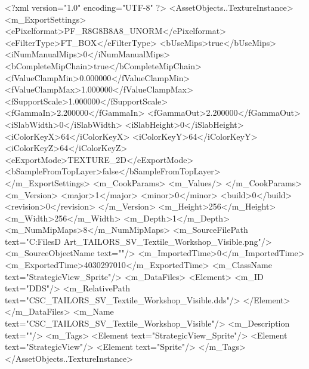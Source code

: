 <?xml version="1.0" encoding="UTF-8" ?>
<AssetObjects..TextureInstance>
	<m_ExportSettings>
		<ePixelformat>PF_R8G8B8A8_UNORM</ePixelformat>
		<eFilterType>FT_BOX</eFilterType>
		<bUseMips>true</bUseMips>
		<iNumManualMips>0</iNumManualMips>
		<bCompleteMipChain>true</bCompleteMipChain>
		<fValueClampMin>0.000000</fValueClampMin>
		<fValueClampMax>1.000000</fValueClampMax>
		<fSupportScale>1.000000</fSupportScale>
		<fGammaIn>2.200000</fGammaIn>
		<fGammaOut>2.200000</fGammaOut>
		<iSlabWidth>0</iSlabWidth>
		<iSlabHeight>0</iSlabHeight>
		<iColorKeyX>64</iColorKeyX>
		<iColorKeyY>64</iColorKeyY>
		<iColorKeyZ>64</iColorKeyZ>
		<eExportMode>TEXTURE_2D</eExportMode>
		<bSampleFromTopLayer>false</bSampleFromTopLayer>
	</m_ExportSettings>
	<m_CookParams>
		<m_Values/>
	</m_CookParams>
	<m_Version>
		<major>1</major>
		<minor>0</minor>
		<build>0</build>
		<revision>0</revision>
	</m_Version>
	<m_Height>256</m_Height>
	<m_Width>256</m_Width>
	<m_Depth>1</m_Depth>
	<m_NumMipMaps>8</m_NumMipMaps>
	<m_SourceFilePath text="C:\Users\Shadow\Desktop\Working Files\2D Art\Quarters\Tailors\StrategicView\CSC_TAILORS_SV_Textile_Workshop_Visible.png"/>
	<m_SourceObjectName text=""/>
	<m_ImportedTime>0</m_ImportedTime>
	<m_ExportedTime>4030297010</m_ExportedTime>
	<m_ClassName text="StrategicView_Sprite"/>
	<m_DataFiles>
		<Element>
			<m_ID text="DDS"/>
			<m_RelativePath text="CSC_TAILORS_SV_Textile_Workshop_Visible.dds"/>
		</Element>
	</m_DataFiles>
	<m_Name text="CSC_TAILORS_SV_Textile_Workshop_Visible"/>
	<m_Description text=""/>
	<m_Tags>
		<Element text="StrategicView_Sprite"/>
		<Element text="StrategicView"/>
		<Element text="Sprite"/>
	</m_Tags>
</AssetObjects..TextureInstance>

